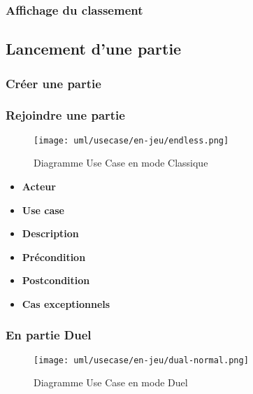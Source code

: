 \documentclass{article}
\begin{document}
\subsubsection{Affichage du classement}

\subsection{Lancement d'une partie}

\subsubsection{Créer une partie}

\subsubsection{Rejoindre une partie}

\begin{figure}
    \centering
    \texttt{[image: uml/usecase/en-jeu/endless.png]}
    \caption{Diagramme Use Case en mode Classique}
    \label{fig:Classique}
\end{figure}

\begin{itemize}
    \item \textbf{Acteur}
    \item \textbf{Use case}
    \item \textbf{Description}
    \item \textbf{Précondition}
    \item \textbf{Postcondition}
    \item \textbf{Cas exceptionnels}
\end{itemize}

\subsubsection{En partie Duel}

\begin{figure}
    \centering
    \texttt{[image: uml/usecase/en-jeu/dual-normal.png]}
    \caption{Diagramme Use Case en mode Duel}
    \label{fig:Duel}
\end{figure}
\end{document}
